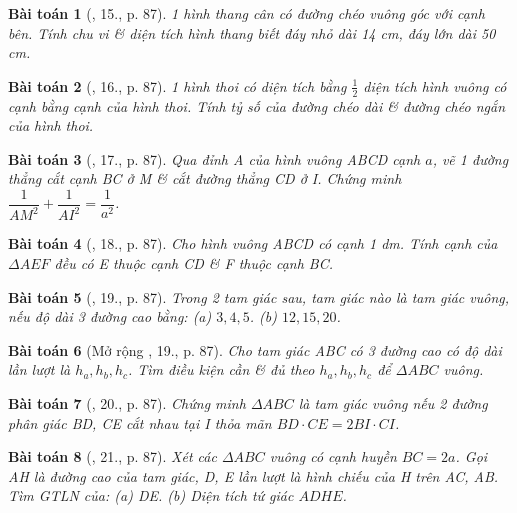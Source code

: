 \documentclass{article}
\newtheorem{baitoan}{Bài toán}
\begin{document}
\begin{baitoan}[\cite{Binh_Toan_9_tap_1}, 15., p. 87]
	1 hình thang cân có đường chéo vuông góc với cạnh bên. Tính chu vi \& diện tích hình thang biết đáy nhỏ dài {\rm14 cm}, đáy lớn dài {\rm50 cm}.
\end{baitoan}

\begin{baitoan}[\cite{Binh_Toan_9_tap_1}, 16., p. 87]
	1 hình thoi có diện tích bằng $\frac{1}{2}$ diện tích hình vuông có cạnh bằng cạnh của hình thoi. Tính tỷ số của đường chéo dài \& đường chéo ngắn của hình thoi.
\end{baitoan}

\begin{baitoan}[\cite{Binh_Toan_9_tap_1}, 17., p. 87]
	Qua đỉnh A của hình vuông ABCD cạnh $a$, vẽ 1 đường thẳng cắt cạnh BC ở M \& cắt đường thẳng CD ở I. Chứng minh $\dfrac{1}{AM^2} + \dfrac{1}{AI^2} = \dfrac{1}{a^2}$.
\end{baitoan}

\begin{baitoan}[\cite{Binh_Toan_9_tap_1}, 18., p. 87]
	Cho hình vuông ABCD có cạnh {\rm1 dm}. Tính cạnh của $\Delta AEF$ đều có E thuộc cạnh CD \& F thuộc cạnh BC.
\end{baitoan}

\begin{baitoan}[\cite{Binh_Toan_9_tap_1}, 19., p. 87]
	Trong 2 tam giác sau, tam giác nào là tam giác vuông, nếu độ dài 3 đường cao bằng: (a) $3,4,5$. (b) $12,15,20$.
\end{baitoan}


\begin{baitoan}[Mở rộng \cite{Binh_Toan_9_tap_1}, 19., p. 87]
	Cho tam giác ABC có 3 đường cao có độ dài lần lượt là $h_a,h_b,h_c$. Tìm điều kiện cần \& đủ theo $h_a,h_b,h_c$ để $\Delta ABC$ vuông.
\end{baitoan}

\begin{baitoan}[\cite{Binh_Toan_9_tap_1}, 20., p. 87]
	Chứng minh $\Delta ABC$ là tam giác vuông nếu 2 đường phân giác BD, CE cắt nhau tại I thỏa mãn $BD\cdot CE = 2BI\cdot CI$.
\end{baitoan}

\begin{baitoan}[\cite{Binh_Toan_9_tap_1}, 21., p. 87]
	Xét các $\Delta ABC$ vuông có cạnh huyền $BC = 2a$. Gọi AH là đường cao của tam giác, D, E lần lượt là hình chiếu của H trên AC, AB. Tìm {\rm GTLN} của: (a) DE. (b) Diện tích tứ giác $ADHE$.
\end{baitoan}
\end{document}
